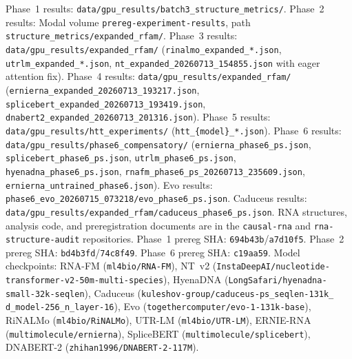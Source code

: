 \documentclass[11pt]{article}
\begin{document}
Phase~1 results: \texttt{data/gpu\_results/batch3\_structure\_metrics/}.
Phase~2 results: Modal volume \texttt{prereg-experiment-results},
path \texttt{structure\_metrics/expanded\_rfam/}.
Phase~3 results: \texttt{data/gpu\_results/expanded\_rfam/}
(\texttt{rinalmo\_expanded\_*.json}, \texttt{utrlm\_expanded\_*.json},
\texttt{nt\_expanded\_20260713\_154855.json} with eager attention fix).
Phase~4 results: \texttt{data/gpu\_results/expanded\_rfam/}
(\texttt{ernierna\_expanded\_20260713\_193217.json},
\texttt{splicebert\_expanded\_20260713\_193419.json},
\texttt{dnabert2\_expanded\_20260713\_201316.json}).
Phase~5 results: \texttt{data/gpu\_results/htt\_experiments/}
(\texttt{htt\_\{model\}\_*.json}).
Phase~6 results: \texttt{data/gpu\_results/phase6\_compensatory/}
(\texttt{ernierna\_phase6\_ps.json},
\texttt{splicebert\_phase6\_ps.json},
\texttt{utrlm\_phase6\_ps.json},
\texttt{hyenadna\_phase6\_ps.json},
\texttt{rnafm\_phase6\_ps\_20260713\_235609.json},
\texttt{ernierna\_untrained\_phase6.json}).
Evo results: \texttt{phase6\_evo\_20260715\_073218/evo\_phase6\_ps.json}.
Caduceus results: \texttt{data/gpu\_results/expanded\_rfam/caduceus\_phase6\_ps.json}.
RNA structures, analysis code, and preregistration documents are in
the \texttt{causal-rna} and \texttt{rna-structure-audit}
repositories.
Phase~1 prereg SHA: \texttt{694b43b}/\texttt{a7d10f5}.
Phase~2 prereg SHA: \texttt{bd4b3fd}/\texttt{74c8f49}.
Phase~6 prereg SHA: \texttt{c19aa59}.
Model checkpoints: RNA-FM (\texttt{ml4bio/RNA-FM}), NT~v2
(\texttt{InstaDeepAI/nucleotide-transformer-v2-50m-multi-species}),
HyenaDNA (\texttt{LongSafari/hyenadna-small-32k-seqlen}),
Caduceus (\texttt{kuleshov-group/caduceus-ps\_seqlen-131k\_%
d\_model-256\_n\_layer-16}),
Evo (\texttt{togethercomputer/evo-1-131k-base}),
RiNALMo (\texttt{ml4bio/RiNALMo}),
UTR-LM (\texttt{ml4bio/UTR-LM}),
ERNIE-RNA (\texttt{multimolecule/ernierna}),
SpliceBERT (\texttt{multimolecule/splicebert}),
DNABERT-2 (\texttt{zhihan1996/DNABERT-2-117M}).



\end{document}

